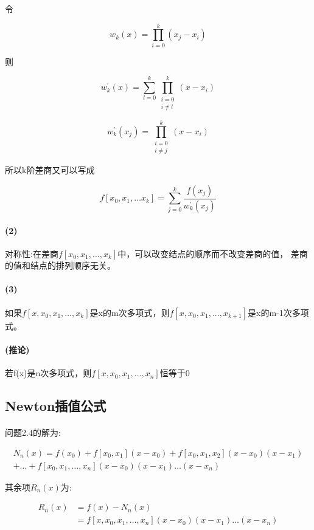 \documentclass[12pt]{report}
\begin{document}
令

\[
	w_k(x) = \prod_{i=0}^k (x_j - x_i)
\]

则

\[
	w_k^\prime(x) = \sum_{l=0}^k \prod_{\substack{i=0 \\ i \neq l}}^k (x - x_i)
\]

\[
	w_k^\prime(x_j) = \prod_{\substack{i=0 \\ i \neq j}}^k (x - x_i)
\]

所以k阶差商又可以写成

\[
	f[x_0, x_1, \ldots x_k] = \sum_{j=0}^k \frac{f(x_j)}{w_{k}^\prime(x_j)}
\]

\paragraph{(2)} 对称性:在差商$f[x_0 , x_1 ,\dots, x_k]$中，可以改变结点的顺序而不改变差商的值，
差商的值和结点的排列顺序无关。

\paragraph{(3)} 如果$f[x,x_0,x_1,\dots,x_k]$是x的m次多项式，则$f[x,x_0,x_1,...,x_{k+1}]$是x的m-1次多项式。 

\paragraph{(推论)} 若f(x)是n次多项式，则$f[x,x_0,x_1,\dots,x_n]$恒等于0


\subsection{Newton插值公式}

\paragraph{ } 问题2.4的解为:

\begin{equation}
	\begin{aligned}
		N_n(x) = f(x_0) + f[x_0, x_1](x - x_0) + f[x_0, x_1, x_2](x - x_0)(x - x_1) \\  
		+\ldots + f[x_0, x_1, \ldots , x_n](x - x_0)(x - x_1)\ldots (x - x_n)
	\end{aligned} \tag{2.11} \label{2.11}
\end{equation}

其余项$R_n(x)$为:

\begin{equation}
	\begin{aligned}
		R_n(x) &= f(x) - N_n(x) \\
		&= f[x, x_0, x_1, \ldots , x_n](x - x_0)(x - x_1) \ldots (x - x_n) 
	\end{aligned} \tag{2.12} \label{2.12}
\end{equation}
\end{document}
